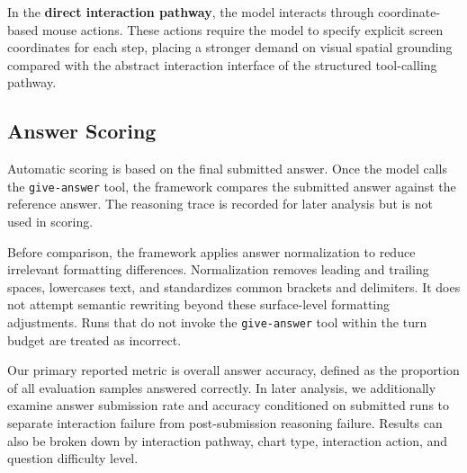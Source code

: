 \documentclass[review,journal,hideappendix]{vgtc} %
\newcommand{\dataset}{InterChartQA}
\newcommand{\placeholder}[1]{\textcolor{red}{\textbf{[Placeholder: #1]}}}
\begin{document}
In the \textbf{direct interaction pathway}, the model interacts through coordinate-based mouse actions. These actions require the model to specify explicit screen coordinates for each step, placing a stronger demand on visual spatial grounding compared with the abstract interaction interface of the structured tool-calling pathway.

\subsection{Answer Scoring}

Automatic scoring is based on the final submitted answer. Once the model calls the \texttt{give-answer} tool, the framework compares the submitted answer against the reference answer. The reasoning trace is recorded for later analysis but is not used in scoring.

Before comparison, the framework applies answer normalization to reduce irrelevant formatting differences.
Normalization removes leading and trailing spaces, lowercases text, and standardizes common brackets and delimiters. It does not attempt semantic rewriting beyond these surface-level formatting adjustments.
Runs that do not invoke the \texttt{give-answer} tool within the turn budget are treated as incorrect.

Our primary reported metric is overall answer accuracy, defined as the proportion of all evaluation samples answered correctly. In later analysis, we additionally examine answer submission rate and accuracy conditioned on submitted runs to separate interaction failure from post-submission reasoning failure. Results can also be broken down by interaction pathway, chart type, interaction action, and question difficulty level.
\end{document}
